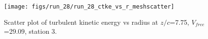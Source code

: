 \begin{figure}[H]
\centering
\texttt{[image: figs/run\_28/run\_28\_ctke\_vs\_r\_meshscatter]}
\caption{Scatter plot of turbulent kinetic energy vs radius at $z/c$=7.75, $V_{free}$=29.09, station 3.}
\label{fig:run_28_ctke_vs_r_meshscatter}
\end{figure}


